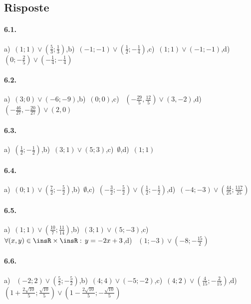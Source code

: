 \subsection{Risposte}
\paragraph{6.1.} a)~\(\left(1;1\right)\vee \left(\frac 5 3;\frac 1 3\right)\),\quad b)~\(\left(-1;-1\right)\vee \left(\frac 1 2;-\frac 1 4\right)\),\quad c)~\(\left(1;1\right)\vee \left(-1;-1\right)\),\quad d)~\(\left(0;-\frac 2 5\right)\vee \left(-\frac 1 4;-\frac 1 4\right)\)

\paragraph{6.2.} a)~\(\left(3;0\right)\vee \left(-6;-9\right)\),\quad b)~\(\left(0;0\right)\),\quad c)~ \(\left(-\frac{29} 5,\frac{12} 5\right)\vee (3,-2)\),\quad d)~\(\left(-\frac{46}{27},-\frac{20}{27}\right)\vee (2,0)\)

\paragraph{6.3.} a)~\(\left(\frac 1 2;-\frac 1 2\right)\),\quad b)~\(\left(3;1\right)\vee \left(5;3\right)\),\quad c)~\(\emptyset \),\quad d)~\(\left(1;1\right)\)

\paragraph{6.4.} a)~\(\left(0;1\right)\vee \left(\frac 7 2;-\frac 5 2\right)\),\quad b)~\(\emptyset \),\quad c)~\(\left(-\frac 3 2;-\frac 5 2\right)\vee \left(\frac 1 2;-\frac 1 2\right)\),\quad d)~\(\left(-4;-3\right)\vee \left(\frac{44}{25};\frac{117}{25}\right)\)

\paragraph{6.5.} a)~\(\left(1;1\right)\vee \left(\frac{10} 7;\frac{11}{14}\right)\),\quad b)~\(\left(3;1\right)\vee \left(5;-3\right)\),\quad c)~\( \forall (x,y)\in \insR \times \insR:\,y=-2x+3\),\quad d)~ \(\left(1;-3\right)\vee \left(-8;-\frac{15} 2\right)\)

\paragraph{6.6.} a)~ \(\left(-2;2\right)\vee \left(\frac 5 2;-\frac 5 2\right)\),\quad b)~\(\left(4;4\right)\vee \left(-5;-2\right)\),\quad c)~\(\left(4;2\right)\vee \left(\frac 4{15};-\frac 2{15}\right)\),\quad d)~\(\left(1+\frac{2\sqrt{10}} 5;\frac{\sqrt{10}} 5\right)\vee \left(1-\frac{2\sqrt{10}} 5;-\frac{\sqrt{10}} 5\right)\)

